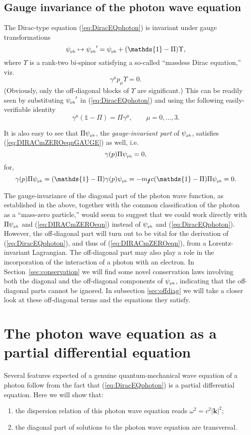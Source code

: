 \documentclass[11pt]{article}
\theoremstyle{definition}
\newcommand{\refeq}[1]{(\ref{#1})}
\newcommand{\vect}[1] {\boldsymbol{{ #1}} }
\newcommand{\kV}{{\vect{k}}}		%
\numberwithin{equation}{section}
\newcommand{\beq}{\begin{equation}}
\newcommand{\eeq}{\end{equation}}
\newcommand{\Id}{\mathds{1}}
\newcommand{\psiPH}{{\psi_{\mbox{\rm\tiny ph}}}}
\newcommand{\mPH}{{m_{\mbox{\Lightning}}}}
\newcommand{\ga}{\gamma}
\begin{document}
\subsection{Gauge invariance of the photon wave equation}\label{sec:gaugeinv}
%
 The Dirac-type equation \refeq{eq:DiracEQphoton} is invariant under gauge transformations 
\beq \label{gaugetrans}
\psiPH \mapsto \psiPH' = \psiPH + (\Id - \Pi) \Upsilon,
\eeq
where $\Upsilon$ is a rank-two bi-spinor satisfying a so-called ``massless Dirac equation,'' viz.
\beq \label{eq:DIRACmZEROeqnGAUGE}
\ga^\mu p_\mu \Upsilon = 0.
\eeq
(Obviously, only the off-diagonal blocks of $\Upsilon$ are significant.)  
This can be readily seen by substituting $\psiPH'$ in \refeq{eq:DiracEQphoton} and using the following easily-verifiable identity
\beq \label{iden:gaPi}
\ga^\mu (\Id - \Pi) = \Pi \ga^\mu,\qquad \mu = 0,\dots,3.
\eeq

 It is also easy to see that $\Pi\psiPH$, the {\em gauge-invariant part} of $\psiPH$, satisfies \refeq{eq:DIRACmZEROeqnGAUGE} as well, i.e.
\beq \label{eq:DIRACmZEROeqn}
\ga(p)\Pi\psiPH = 0, 
\eeq
for,
\beq 
\ga(p)\Pi\psiPH = (\Id-\Pi)\ga(p)\psiPH =- \mPH c(\Id - \Pi)\Pi\psiPH = 0.
\eeq

 The gauge-invariance of the diagonal part of the photon wave function, as established in the above,  together with the common 
classification of the photon as a ``mass-zero particle,'' 
would seem to suggest that we could work directly with $\Pi\psiPH$ and \refeq{eq:DIRACmZEROeqn} instead of
 $\psiPH$ and \refeq{eq:DiracEQphoton}.
 However, the off-diagonal part will turn out to be vital for the derivation of \refeq{eq:DiracEQphoton}, and thus of \refeq{eq:DIRACmZEROeqn},
from a Lorentz-invariant Lagrangian.
 The off-diagonal part may also play a role in the incorporation of the interaction of a photon with an electron. 
In Section~\ref{sec:conservation} we will find some novel conservation laws involving both the diagonal and the off-diagonal components 
of $\psiPH$, indicating that the off-diagonal parts cannot be ignored. In subsection \ref{sec:offdiag} we will take a closer look at 
these off-diagonal terms and the equations they satisfy.  
\section{The photon wave equation as a partial differential equation}\label{sec:PDE}
%
 Several features expected of a genuine quantum-mechanical wave equation of a photon follow from the fact that \refeq{eq:DiracEQphoton}
is a partial differential equation. 
 Here we will show that:
\begin{enumerate}
\item 
the dispersion relation of this photon wave equation reads $\omega^2 =  c^2|\kV|^2$;
\item
the diagonal part of solutions to the photon wave equation are transversal.
\end{enumerate}
\end{document}
